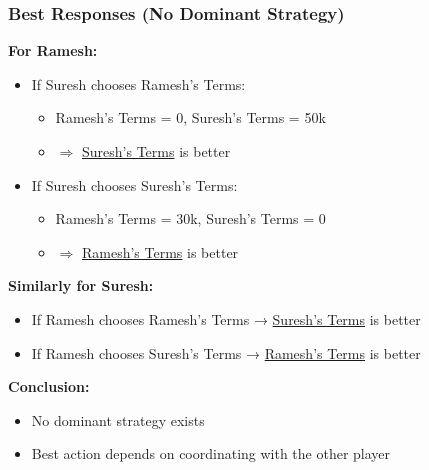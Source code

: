 \begin{frame}[fragile]\frametitle{Best Responses (No Dominant Strategy)}

\textbf{For Ramesh:}

\begin{itemize}
  \item If Suresh chooses Ramesh's Terms:
  \begin{itemize}
    \item Ramesh's Terms = 0, Suresh's Terms = 50k
    \item $\Rightarrow$ \underline{Suresh's Terms} is better
  \end{itemize}
  
  \item If Suresh chooses Suresh's Terms:
  \begin{itemize}
    \item Ramesh's Terms = 30k, Suresh's Terms = 0
    \item $\Rightarrow$ \underline{Ramesh's Terms} is better
  \end{itemize}
\end{itemize}

\vspace{6pt}

\textbf{Similarly for Suresh:}

\begin{itemize}
  \item If Ramesh chooses Ramesh's Terms → \underline{Suresh's Terms} is better
  \item If Ramesh chooses Suresh's Terms → \underline{Ramesh's Terms} is better
\end{itemize}

\vspace{8pt}

\textbf{Conclusion:}
\begin{itemize}
  \item No dominant strategy exists
  \item Best action depends on coordinating with the other player
\end{itemize}

\end{frame}

